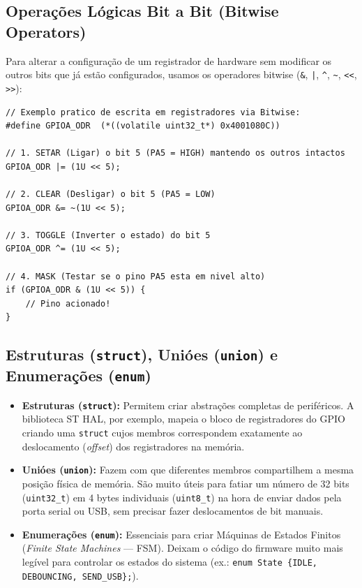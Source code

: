 \documentclass[12pt, a4paper]{article}
\begin{document}
\subsection{Operações Lógicas Bit a Bit (Bitwise Operators)}
\hspace*{1.25cm}Para alterar a configuração de um registrador de hardware sem modificar os outros bits que já estão configurados, usamos os operadores bitwise (\texttt{\&}, \texttt{|}, \texttt{\^{}}, \texttt{\~{}}, \texttt{<<}, \texttt{>>}):

\begin{lstlisting}
// Exemplo pratico de escrita em registradores via Bitwise:
#define GPIOA_ODR  (*((volatile uint32_t*) 0x4001080C))

// 1. SETAR (Ligar) o bit 5 (PA5 = HIGH) mantendo os outros intactos
GPIOA_ODR |= (1U << 5);

// 2. CLEAR (Desligar) o bit 5 (PA5 = LOW)
GPIOA_ODR &= ~(1U << 5);

// 3. TOGGLE (Inverter o estado) do bit 5
GPIOA_ODR ^= (1U << 5);

// 4. MASK (Testar se o pino PA5 esta em nivel alto)
if (GPIOA_ODR & (1U << 5)) {
    // Pino acionado!
}
\end{lstlisting}

\subsection{Estruturas (\texttt{struct}), Unióes (\texttt{union}) e Enumerações (\texttt{enum})}
\begin{itemize}
    \item \textbf{Estruturas (\texttt{struct}):} Permitem criar abstrações completas de periféricos. A biblioteca ST HAL, por exemplo, mapeia o bloco de registradores do GPIO criando uma \texttt{struct} cujos membros correspondem exatamente ao deslocamento (\textit{offset}) dos registradores na memória.
    \item \textbf{Unióes (\texttt{union}):} Fazem com que diferentes membros compartilhem a mesma posição física de memória. São muito úteis para fatiar um número de 32 bits (\texttt{uint32\_t}) em 4 bytes individuais (\texttt{uint8\_t}) na hora de enviar dados pela porta serial ou USB, sem precisar fazer deslocamentos de bit manuais.
    \item \textbf{Enumerações (\texttt{enum}):} Essenciais para criar Máquinas de Estados Finitos (\textit{Finite State Machines} — FSM). Deixam o código do firmware muito mais legível para controlar os estados do sistema (ex.: \texttt{enum State \{IDLE, DEBOUNCING, SEND\_USB\};}).
\end{itemize}
\end{document}
